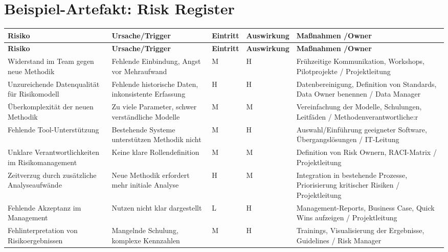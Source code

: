\section{Beispiel-Artefakt: Risk Register}
\begin{longtable}{@{}p{3.0cm}p{3.2cm}p{2.1cm}p{2.1cm}p{4.2cm}@{}}
\toprule
\textbf{Risiko} & \textbf{Ursache/\allowbreak Trigger} & \textbf{Eintritt} & \textbf{Aus\allowbreak wirkung} & \textbf{Maßnahmen /\allowbreak Owner} \\
\midrule
\endfirsthead
\toprule
\textbf{Risiko} & \textbf{Ursache/\allowbreak Trigger} & \textbf{Eintritt} & \textbf{Aus\allowbreak wirkung} & \textbf{Maßnahmen /\allowbreak Owner} \\
\midrule
\endhead

Widerstand im Team gegen neue Methodik 
& Fehlende Einbindung, Angst vor Mehraufwand 
& M 
& H 
& Frühzeitige Kommunikation, Workshops, Pilotprojekte / Projektleitung \\

Unzureichende Datenqualität für Risikomodell 
& Fehlende historische Daten, inkonsistente Erfassung 
& H 
& H 
& Datenbereinigung, Definition von Standards, Data Owner benennen / Data Manager \\

Überkomplexität der neuen Methodik 
& Zu viele Parameter, schwer verständliche Modelle 
& M 
& M 
& Vereinfachung der Modelle, Schulungen, Leitfäden / Methodenverantwortliche:r \\

Fehlende Tool-Unterstützung 
& Bestehende Systeme unterstützen Methodik nicht 
& M 
& H 
& Auswahl/Einführung geeigneter Software, Übergangslösungen / IT-Leitung \\

Unklare Verantwortlichkeiten im Risikomanagement 
& Keine klare Rollendefinition 
& M 
& M 
& Definition von Risk Ownern, RACI-Matrix / Projektleitung \\

Zeitverzug durch zusätzliche Analyseaufwände 
& Neue Methodik erfordert mehr initiale Analyse 
& H 
& M 
& Integration in bestehende Prozesse, Priorisierung kritischer Risiken / Projektleitung \\

Fehlende Akzeptanz im Management 
& Nutzen nicht klar dargestellt 
& L 
& H 
& Management-Reports, Business Case, Quick Wins aufzeigen / Projektleitung \\

Fehlinterpretation von Risikoergebnissen 
& Mangelnde Schulung, komplexe Kennzahlen 
& M 
& H 
& Trainings, Visualisierung der Ergebnisse, Guidelines / Risk Manager \\


\end{longtable}
